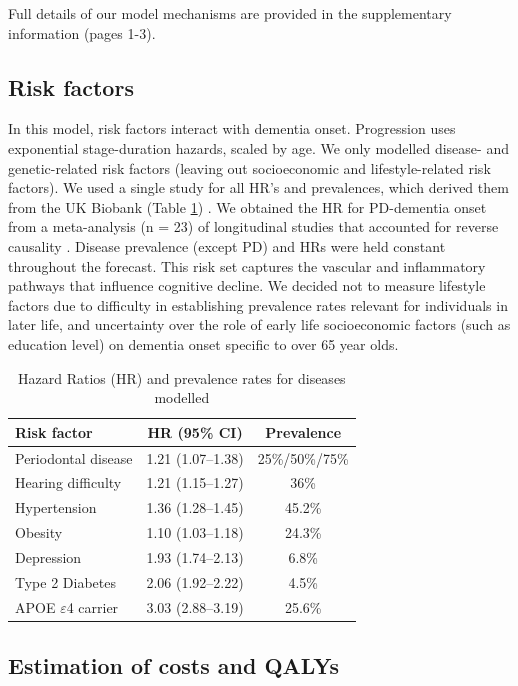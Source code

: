 \documentclass[11pt,a4paper]{article}
\begin{document}
Full details of our model mechanisms are provided in the supplementary information (pages 1-3).

\subsection{Risk factors}

In this model, risk factors interact with dementia onset. Progression uses exponential stage-duration hazards, scaled by age. We only modelled disease- and genetic-related risk factors (leaving out socioeconomic and lifestyle-related risk factors). We used a single study for all HR's and prevalences, which derived them from the UK Biobank (Table \ref{tab:risk_factors}) \cite{ref32}. We obtained the HR for PD-dementia onset from a meta-analysis (n = 23) of longitudinal studies that accounted for reverse causality \cite{ref33}. Disease prevalence (except PD) and HRs were held constant throughout the forecast. This risk set captures the vascular and inflammatory pathways that influence cognitive decline. We decided not to measure lifestyle factors due to difficulty in establishing prevalence rates relevant for individuals in later life, and uncertainty over the role of early life socioeconomic factors (such as education level) on dementia onset specific to over 65 year olds.

\begin{table}[htbp]
\centering
\caption{Hazard Ratios (HR) and prevalence rates for diseases modelled}
\label{tab:risk_factors}
\begin{tabular}{lcc}
\toprule
\textbf{Risk factor} & \textbf{HR (95\% CI)} & \textbf{Prevalence} \\
\midrule
Periodontal disease & 1.21 (1.07--1.38) & 25\%/50\%/75\% \\
Hearing difficulty & 1.21 (1.15--1.27) & 36\% \\
Hypertension & 1.36 (1.28--1.45) & 45.2\% \\
Obesity & 1.10 (1.03--1.18) & 24.3\% \\
Depression & 1.93 (1.74--2.13) & 6.8\% \\
Type 2 Diabetes & 2.06 (1.92--2.22) & 4.5\% \\
APOE $\varepsilon$4 carrier & 3.03 (2.88--3.19) & 25.6\% \\
\bottomrule
\end{tabular}
\end{table}

\subsection{Estimation of costs and QALYs}
\end{document}
